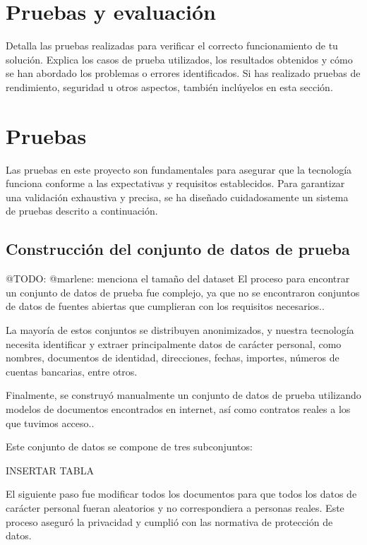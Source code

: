 \section{Pruebas y evaluación}\label{sec:Pruebas y evaluación}

Detalla las pruebas realizadas para verificar el correcto funcionamiento de tu solución.
Explica los casos de prueba utilizados, los resultados obtenidos y cómo se han abordado los problemas o errores
identificados.
Si has realizado pruebas de rendimiento, seguridad u otros aspectos, también inclúyelos en esta sección.


\section{Pruebas}
Las pruebas en este proyecto son fundamentales para asegurar que la tecnología funciona conforme a las expectativas y
requisitos establecidos. Para garantizar una validación exhaustiva y precisa, se ha diseñado cuidadosamente un sistema
de pruebas descrito a continuación.

\subsection*{Construcción del conjunto de datos de prueba}

\colorbox{color_highlight}{@TODO: @marlene:} menciona el tamaño del dataset
El proceso para encontrar un conjunto de datos de prueba fue complejo, ya que no se encontraron conjuntos de datos de
fuentes abiertas que cumplieran con los requisitos necesarios..

La mayoría de estos conjuntos se distribuyen anonimizados, y nuestra tecnología necesita identificar y extraer
principalmente datos de carácter personal, como nombres, documentos de identidad, direcciones, fechas, importes, números
de cuentas bancarias, entre otros.

Finalmente, se construyó manualmente un conjunto de datos de prueba utilizando modelos de documentos encontrados en
internet, así como contratos reales a los que tuvimos acceso..

Este conjunto de datos se compone de tres subconjuntos:


INSERTAR TABLA

El siguiente paso fue modificar todos los documentos para que todos los datos de carácter personal fueran aleatorios y
no correspondiera a personas reales. Este proceso aseguró la privacidad y cumplió con las normativa de protección de
datos.

